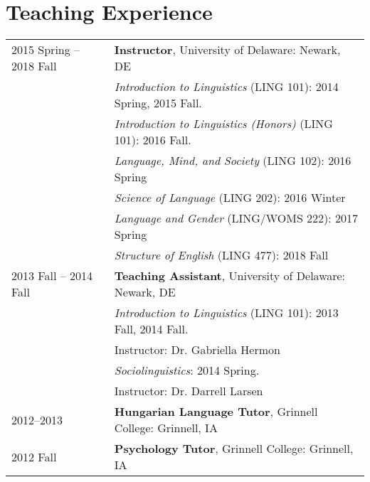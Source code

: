 \documentclass[11pt]{article} %
\begin{document}
\section*{Teaching Experience}
\begin{longtable}{p{1.6in} p{5.3in}}
	2015 Spring -- 2018 Fall & \textbf{Instructor}, University of Delaware: Newark, DE \\  
	& \textit{Introduction to Linguistics} (LING 101): 2014 Spring, 2015 Fall. 
	\\ 
	& \textit{Introduction to Linguistics (Honors)} (LING 101): 2016 Fall.\\
	& \textit{Language, Mind, and Society} (LING 102): 2016 Spring \\
	& \textit{Science of Language} (LING 202): 2016 Winter \\ 
	& \textit{Language and Gender} (LING/WOMS 222): 2017 Spring \\
	& \textit{Structure of English} (LING 477): 2018 Fall \\
	[5pt]
	2013 Fall -- 2014 Fall & \textbf{Teaching Assistant}, University of Delaware: Newark, DE \\ 
	& \textit{Introduction to Linguistics} (LING 101): 2013 Fall, 2014 Fall. \\
	& \hspace{0.2in} Instructor: Dr. Gabriella Hermon \\
	& \textit{Sociolinguistics}: 2014 Spring.\\
	& \hspace{0.2in} Instructor: Dr. Darrell Larsen \\
	[5pt]
	2012--2013 & \textbf{Hungarian Language Tutor}, Grinnell College: Grinnell, IA \\[5pt]
	2012 Fall & \textbf{Psychology Tutor}, Grinnell College: Grinnell, IA \\
	
\end{longtable}


\end{document}
